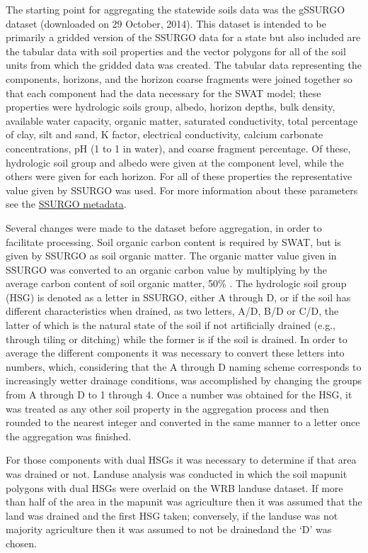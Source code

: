 The starting point for aggregating the statewide soils data was the gSSURGO dataset (downloaded on 29 October, 2014). This dataset is intended to be primarily a gridded version of the SSURGO data for a state but also included are the tabular data with soil properties and the vector polygons for all of the soil units from which the gridded data was created. The tabular data representing the components, horizons, and the horizon coarse fragments were joined together so that each component had the data necessary for the SWAT model; these properties were hydrologic soils group, albedo, horizon depths, bulk density, available water capacity, organic matter, saturated conductivity, total percentage of clay, silt and sand, K factor, electrical conductivity, calcium carbonate concentrations, pH (1 to 1 in water), and coarse fragment percentage. Of these, hydrologic soil group and albedo were given at the component level, while the others were given for each horizon.  For all of these properties the representative value given by SSURGO was used. For more information about these parameters see the \href{http://www.nrcs.usda.gov/wps/portal/nrcs/detail/soils/survey/?cid=nrcs142p2_053631}{SSURGO metadata}. 

Several changes were made to the dataset before aggregation, in order to facilitate processing. Soil organic carbon content is required by SWAT, but is given by SSURGO as soil organic matter. The organic matter value given in SSURGO was converted to an organic carbon value by multiplying by the average carbon content of soil organic matter, 50\% \citep{brady_introsoils_2002}. The hydrologic soil group (HSG) is denoted as a letter in SSURGO, either A through D, or if the soil has different characteristics when drained, as two letters, A/D, B/D or C/D, the latter of which is the natural state of the soil if not artificially drained (e.g., through tiling or ditching) while the former is if the soil is drained. In order to average the different components it was necessary to convert these letters into numbers, which, considering that the A through D naming scheme corresponds to increasingly wetter drainage conditions, was accomplished by changing the groups from A through D to 1 through 4. Once a number was obtained for the HSG, it was treated as any other soil property in the aggregation process and then rounded to the nearest integer and converted in the same manner to a letter once the aggregation was finished. 

For those components with dual HSGs it was necessary to determine if that area was drained or not. Landuse analysis was conducted in which the soil mapunit polygons with dual HSGs were overlaid on the WRB landuse dataset. If more than half of the area in the mapunit was agriculture then it was assumed that the land was drained and the first HSG taken; conversely, if the landuse was not majority agriculture then it was assumed to not be drainedand the `D' was chosen.

